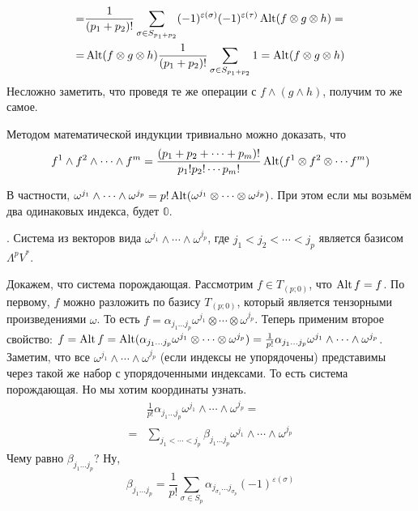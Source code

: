 \documentclass{article}
\begin{document}
\begin{itemize}
\begin{Proof}
\[\begin{split}
                =&\frac1{(p_1+p_2)!}\sum\limits_{\sigma\in S_{p_1+p_2}}(-1)^{\varepsilon(\sigma)}(-1)^{\varepsilon(\tau)}\operatorname{Alt}(f\otimes g\otimes h)=\\
                =&\operatorname{Alt}(f\otimes g\otimes h)\frac1{(p_1+p_2)!}\sum\limits_{\sigma\in S_{p_1+p_2}}1=\operatorname{Alt}(f\otimes g\otimes h)
            \end{split}
            \]
            Несложно заметить, что проведя те же операции с $f\land(g\land h)$, получим то же самое.
        \end{Proof}
        \thm Методом математической индукции тривиально можно доказать, что
        \[
        f^1\land f^2\land\cdots\land f^m=\frac{(p_1+p_2+\cdots+p_m)!}{p_1!p_2!\cdots p_m!}\operatorname{Alt}(f^1\otimes f^2\otimes\cdots f^m)
        \]
        \begin{Example}
            В частности, $\omega^{j_1}\land\cdots\land\omega^{j_p}=p!\operatorname{Alt}(\omega^{j_1}\otimes\cdots\otimes\omega^{j_p})$. При этом если мы возьмём два одинаковых индекса, будет $\mathbb0$.
        \end{Example}
        \thm {}. Система из векторов вида $\omega^{j_1}\land\cdots\land\omega^{j_p}$, где $j_1<j_2<\cdots<j_p$ является базисом $\Lambda^pV^*$.
        \begin{Proof}
            Докажем, что система порождающая. Рассмотрим $f\in T_{(p;0)}$, что $\operatorname{Alt} f=f$. По первому, $f$ можно разложить по базису $T_{(p;0)}$, который является тензорными произведениями $\omega$. То есть $f=\alpha_{j_1\ldots j_p}\omega^{j_1}\otimes\cdots\otimes\omega^{j_p}$. Теперь применим второе свойство: $f=\operatorname{Alt} f=\operatorname{Alt}(\alpha_{j_1\ldots j_p}\omega^{j_1}\otimes\cdots\otimes\omega^{j_p})=\frac1{p!}\alpha_{j_1\ldots j_p}\omega^{j_1}\land\cdots\land\omega^{j_p}$. Заметим, что все $\omega^{j_1}\land\cdots\land\omega^{j_p}$ (если индексы не упорядочены) представимы через такой же набор с упорядоченными индексами. То есть система порождающая. Но мы хотим координаты узнать.
            \[\begin{split}
                &\frac1{p!}\alpha_{j_1\ldots j_p}\omega^{j_1}\land\cdots\land\omega^{j_p}=\\
                =&\sum\limits_{j_1<\cdots<j_p}\beta_{j_1\ldots j_p}\omega^{j_1}\land\cdots\land\omega^{j_p}
            \end{split}\]
            Чему равно $\beta_{j_1\ldots j_p}$? Ну,
            $$
            \beta_{j_1\ldots j_p}=\frac1{p!}\sum\limits_{\sigma\in S_p}\alpha_{j_{\sigma_1}\ldots j_{\sigma_p}}(-1)^{\varepsilon(\sigma)}
$$
\end{Proof}
\end{itemize}
\end{document}
